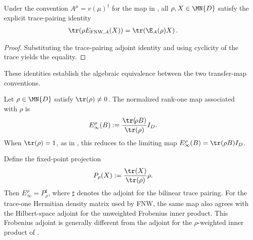\begin{lemma}
    \label{thm:trace_mul_fnw_transfer_map}
    \leanok
    Under the convention $A^\mu=v(\mu)^\dagger$ for the map in
    \cite[Equations~(5.2)--(5.3)]{Fannes1992Finitely}, all $\rho,X\in\MN{D}$
    satisfy the explicit trace-pairing identity
    \begin{align}
        \tr\!\left(\rho E_{\mathrm{FNW},A}(X)\right)
         & =\tr\!\left(\E_A(\rho)X\right).
        \label{eq:trace_mul_fnw_transfer_map}
    \end{align}
\end{lemma}

\begin{proof}
    \leanok
    Substituting the trace-pairing adjoint identity and using cyclicity of the
    trace yields the equality.
\end{proof}

These identities establish the algebraic equivalence between the two transfer-map
conventions.

\begin{definition}
    \label{def:fnw_limit_map}
    \leanok
    Let $\rho\in\MN{D}$ satisfy $\tr(\rho)\neq0$. The normalized rank-one map
    associated with $\rho$ is
    \begin{align}
        E_\infty^\rho(B)
         & :=\frac{\tr(\!\rho B)}{\tr(\rho)}I_D.
        \label{eq:fnw_limit_map}
    \end{align}
    When $\tr(\rho)=1$, as in \cite[Equation~(5.1)]{Fannes1992Finitely}, this
    reduces to the limiting map $E_\infty^\rho(B)=\tr(\rho B)I_D$.
\end{definition}

\begin{lemma}
    \label{thm:fnw_limit_map_trace_adjoint}
    \leanok
    Define the fixed-point projection
    \begin{align}
        P_\rho(X)
         & :=\frac{\tr(X)}{\tr(\rho)}\rho.
        \label{eq:fnw_fixed_point_projection}
    \end{align}
    Then $E_\infty^\rho=P_\rho^\sharp$, where $\sharp$ denotes the adjoint for
    the bilinear trace pairing. For the trace-one Hermitian density matrix used
    by FNW, the same map also agrees with the Hilbert-space adjoint for the
    unweighted Frobenius inner product. This Frobenius adjoint is generally
    different from the adjoint for the $\rho$-weighted inner product of
    \cite[Equation~(5.6)]{Fannes1992Finitely}.
\end{lemma}

